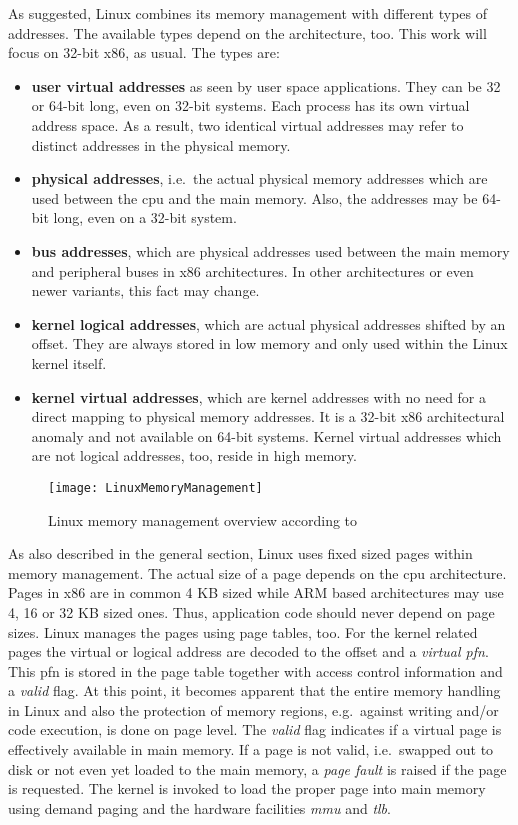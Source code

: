 As suggested, Linux combines its memory management with different types of addresses.
The available types depend on the architecture, too.
This work will focus on 32-bit x86, as usual.
The types are:
\begin{itemize}
    \item \textbf{user virtual addresses} as seen by user space applications. They can be 32 or 64-bit long, even on 32-bit systems. Each process has its own virtual address space. As a result, two identical virtual addresses may refer to distinct addresses in the physical memory.
    \item \textbf{physical addresses}, i.e.\ the actual physical memory addresses which are used between the \ac{cpu} and the main memory. Also, the addresses may be 64-bit long, even on a 32-bit system.
    \item \textbf{bus addresses}, which are physical addresses used between the main memory and peripheral buses in x86 architectures. In other architectures or even newer variants, this fact may change.
    \item \textbf{kernel logical addresses}, which are actual physical addresses shifted by an offset. They are always stored in low memory and only used within the Linux kernel itself.
    \item \textbf{kernel virtual addresses}, which are kernel addresses with no need for a direct mapping to physical memory addresses. It is a 32-bit x86 architectural anomaly and not available on 64-bit systems. Kernel virtual addresses which are not logical addresses, too, reside in high memory\cite{lfd430}.
\end{itemize}

\begin{figure} [t]
	\centering
	\texttt{[image: LinuxMemoryManagement]}
	\caption{Linux memory management overview according to~\cite{lfd430}}\label{pic:linux-mem}
\end{figure}

As also described in the general section, Linux uses fixed sized pages within memory management.
The actual size of a page depends on the \ac{cpu} architecture.
Pages in x86 are in common 4 KB sized while ARM based architectures may use 4, 16 or 32 KB sized ones. 
Thus, application code should never depend on page sizes.
Linux manages the pages using page tables, too.
For the kernel related pages the virtual or logical address are decoded to the offset and a \textit{virtual \ac{pfn}}.
This \ac{pfn} is stored in the page table together with access control information and a \textit{valid} flag.
At this point, it becomes apparent that the entire memory handling in Linux and also the protection of memory regions, e.g.\ against writing and/or code execution, is done on page level.
The \textit{valid} flag indicates if a virtual page is effectively available in main memory. 
If a page is not valid, i.e.\ swapped out to disk or not even yet loaded to the main memory, a \textit{page fault} is raised if the page is requested.
The kernel is invoked to load the proper page into main memory using demand paging and the hardware facilities \textit{\ac{mmu}} and \textit{\ac{tlb}}\cite{lfd430}.

